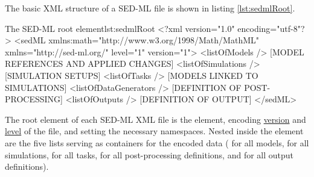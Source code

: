 The basic XML structure of a SED-ML file is shown in listing  \vref{lst:sedmlRoot}.
%
\begin{myXmlLst}{The SED-ML root element}{lst:sedmlRoot}
<?xml version="1.0" encoding="utf-8"?>
<sedML xmlns:math="http://www.w3.org/1998/Math/MathML" 
       xmlns="http://sed-ml.org/" level="1" version="1">
 <listOfModels />
  [MODEL REFERENCES AND APPLIED CHANGES]
 <listOfSimulations />
  [SIMULATION SETUPS]
 <listOfTasks />
  [MODELS LINKED TO SIMULATIONS]
 <listOfDataGenerators />
  [DEFINITION OF POST-PROCESSING]
 <listOfOutputs />
  [DEFINITION OF OUTPUT]
</sedML>
\end{myXmlLst}
%
The root element of each SED-ML XML file is the  element, encoding \hyperref[sec:version]{version} and \hyperref[sec:level]{level} of the file, and setting the necessary namespaces. Nested inside the  element are the five lists serving as containers for the encoded data ( for all models,  for all simulations,  for all tasks,  for all post-processing definitions, and  for all output definitions).









